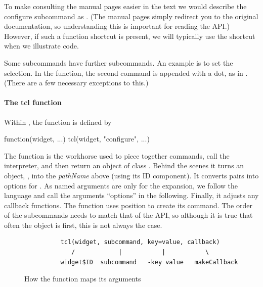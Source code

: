 To make consulting the \TK\/ manual pages easier in the text we would
describe the configure subcommand as
. (The \R\/ manual pages
simply redirect you to the original \TK\/ documentation, so
understanding this is important for reading the API.) However, if such
a function shortcut is present, we will typically use the shortcut when we
illustrate code. 

Some subcommands have further subcommands. An example
is to set the selection. In the \R\/ function, the second command is
appended with a dot, as in . (There are a few
necessary exceptions to this.)

\paragraph{The tcl function} Within , the  function is defined by

\begin{Sinput}
function(widget, ...) tcl(widget, "configure", ...)
\end{Sinput}

The  function is the workhorse used to piece
together \TCL\/ commands, call the interpreter, and then return an
object of class .  Behind the scenes it turns an \R\/
object, , into the \textit{pathName} above (using its ID
component). It converts \R\/  pairs into  options for \TCL. As named arguments are only for the
 expansion, we follow the \TCL\/ language and call
the arguments ``options'' in the following. Finally, it adjusts any
callback functions. The  function uses position to
create its command. The order of the subcommands needs to match that
of the \TK\/ API, so although it is true that often the \R\/ object is
first, this is not always the case.

\begin{figure}
  \centering
\begin{verbatim}
          tcl(widget, subcommand, key=value, callback)
             /            |           |           \
          widget$ID  subcommand   -key value   makeCallback
\end{verbatim}
  \caption{How the  function maps its arguments}
  \label{fig:tcl-function-map}
\end{figure}






